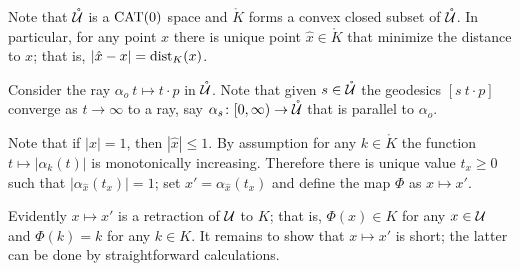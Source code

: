\documentclass[oneside,a4paper, 12pt]{article}
\begin{document}
Note that $\mathring{\mathcal{U}}$ is a $\mathrm{CAT}(0)$ space and $\mathring{K}$ forms a convex closed subset of $\mathring{\mathcal{U}}$.
In particular, for any point $x$ there is unique point $\hat x\in \mathring{K}$
that minimize the distance to $x$;
that is, $|\hat x-x|=\mathop{\rm dist}\nolimits_K(x)$.

Consider the ray $\alpha_o\:t\mapsto t\cdot p$ in  $\mathring{\mathcal{U}}$.
Note that given $s\in \mathring{\mathcal{U}}$
the geodesics $[s\ t\cdot p]$ converge as $t\to\infty$ to a ray, 
say $\alpha_s\colon[0,\infty)\to \mathring{\mathcal{U}}$ that is parallel to $\alpha_o$.

Note that if $|x|=1$, then $|\hat x|\le 1$.
By assumption for any $k\in \mathring{K}$ the function $t\mapsto |\alpha_k(t)|$ is monotonically increasing.
Therefore there is unique value $t_x\ge 0$ such that
$|\alpha_{\hat x}(t_x)|=1$;
set $x'=\alpha_{\hat x}(t_x)$ and define the map $\Phi$ as $x\mapsto x'$.

Evidently $x\mapsto x'$ is a retraction of $\mathcal{U}$ to $K$;
that is,
$\Phi(x)\in K$ for any $x\in \mathcal{U}$
and 
$\Phi(k)=k$ for any $k\in K$.
It remains to show that $x\mapsto x'$ is short; 
the latter can be done by straightforward calculations.
\qeds

{\small\sloppy

\printbibliography[heading=bibintoc]

}
\end{document}
